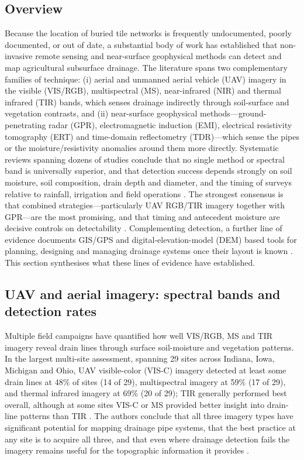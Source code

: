 \subsection{Overview}

Because the location of buried tile networks is frequently undocumented, poorly documented, or out of date, a substantial body of work has established that non-invasive remote sensing and near-surface geophysical methods can detect and map agricultural subsurface drainage. The literature spans two complementary families of technique: (i) aerial and unmanned aerial vehicle (UAV) imagery in the visible (VIS/RGB), multispectral (MS), near-infrared (NIR) and thermal infrared (TIR) bands, which senses drainage indirectly through soil-surface and vegetation contrasts, and (ii) near-surface geophysical methods---ground-penetrating radar (GPR), electromagnetic induction (EMI), electrical resistivity tomography (ERT) and time-domain reflectometry (TDR)---which sense the pipes or the moisture/resistivity anomalies around them more directly. Systematic reviews spanning dozens of studies conclude that no single method or spectral band is universally superior, and that detection success depends strongly on soil moisture, soil composition, drain depth and diameter, and the timing of surveys relative to rainfall, irrigation and field operations \parencite{Carlsen2024,Wienken2024}. The strongest consensus is that combined strategies---particularly UAV RGB/TIR imagery together with GPR---are the most promising, and that timing and antecedent moisture are decisive controls on detectability \parencite{Wienken2024,Carlsen2024,Koganti2021}. Complementing detection, a further line of evidence documents GIS/GPS and digital-elevation-model (DEM) based tools for planning, designing and managing drainage systems once their layout is known \parencite{Shedekar2018,Falasy2024,Falasy2025,Falasy2025b}. This section synthesises what these lines of evidence have established.

\subsection{UAV and aerial imagery: spectral bands and detection rates}

Multiple field campaigns have quantified how well VIS/RGB, MS and TIR imagery reveal drain lines through surface soil-moisture and vegetation patterns. In the largest multi-site assessment, spanning 29 sites across Indiana, Iowa, Michigan and Ohio, UAV visible-color (VIS-C) imagery detected at least some drain lines at 48\% of sites (14 of 29), multispectral imagery at 59\% (17 of 29), and thermal infrared imagery at 69\% (20 of 29); TIR generally performed best overall, although at some sites VIS-C or MS provided better insight into drain-line patterns than TIR \parencite{Allred2020}. The authors conclude that all three imagery types have significant potential for mapping drainage pipe systems, that the best practice at any site is to acquire all three, and that even where drainage detection fails the imagery remains useful for the topographic information it provides \parencite{Allred2020}.

